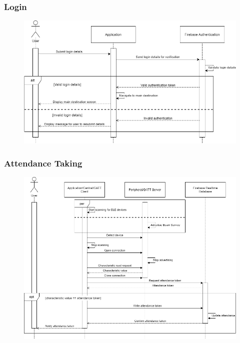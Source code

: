 \documentclass[../report.tex]{subfiles}
\begin{document}
\subsubsection{Login}
\begin{figure}[H]
\centering
\includegraphics[width=\textwidth]{./images/05-07-app-login.png}
\label{fig:app-login-seq}
\end{figure}

\subsubsection{Attendance Taking}
\begin{figure}[H]
\centering
\includegraphics[width=\textwidth]{./images/05-07-app-attendance.png}
\label{fig:app-attendance-seq}
\end{figure}
\end{document}
